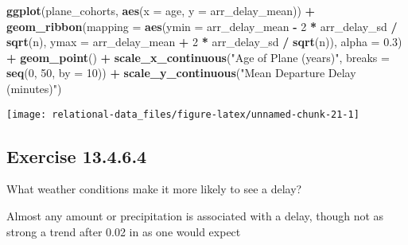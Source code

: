 \documentclass[]{book}
\newenvironment{Shaded}{\begin{snugshade}}{\end{snugshade}}
\newcommand{\DataTypeTok}[1]{\textcolor[rgb]{0.13,0.29,0.53}{#1}}
\newcommand{\DecValTok}[1]{\textcolor[rgb]{0.00,0.00,0.81}{#1}}
\newcommand{\FloatTok}[1]{\textcolor[rgb]{0.00,0.00,0.81}{#1}}
\newcommand{\KeywordTok}[1]{\textcolor[rgb]{0.13,0.29,0.53}{\textbf{#1}}}
\newcommand{\NormalTok}[1]{#1}
\newcommand{\OperatorTok}[1]{\textcolor[rgb]{0.81,0.36,0.00}{\textbf{#1}}}
\newcommand{\StringTok}[1]{\textcolor[rgb]{0.31,0.60,0.02}{#1}}
\theoremstyle{plain}
\theoremstyle{remark}
\begin{document}
\begin{Shaded}
\begin{Highlighting}[]
\KeywordTok{ggplot}\NormalTok{(plane_cohorts, }\KeywordTok{aes}\NormalTok{(}\DataTypeTok{x =}\NormalTok{ age, }\DataTypeTok{y =}\NormalTok{ arr_delay_mean)) }\OperatorTok{+}
\StringTok{  }\KeywordTok{geom_ribbon}\NormalTok{(}\DataTypeTok{mapping =} \KeywordTok{aes}\NormalTok{(}\DataTypeTok{ymin =}\NormalTok{ arr_delay_mean }\OperatorTok{-}\StringTok{ }
\StringTok{                              }\DecValTok{2} \OperatorTok{*}\StringTok{ }\NormalTok{arr_delay_sd }\OperatorTok{/}\StringTok{ }\KeywordTok{sqrt}\NormalTok{(n), }
                            \DataTypeTok{ymax =}\NormalTok{ arr_delay_mean }\OperatorTok{+}\StringTok{ }
\StringTok{                              }\DecValTok{2} \OperatorTok{*}\StringTok{ }\NormalTok{arr_delay_sd }\OperatorTok{/}\StringTok{ }\KeywordTok{sqrt}\NormalTok{(n)),}
              \DataTypeTok{alpha =} \FloatTok{0.3}\NormalTok{) }\OperatorTok{+}
\StringTok{  }\KeywordTok{geom_point}\NormalTok{() }\OperatorTok{+}
\StringTok{  }\KeywordTok{scale_x_continuous}\NormalTok{(}\StringTok{"Age of Plane (years)"}\NormalTok{, }\DataTypeTok{breaks =} \KeywordTok{seq}\NormalTok{(}\DecValTok{0}\NormalTok{, }\DecValTok{50}\NormalTok{, }\DataTypeTok{by =} \DecValTok{10}\NormalTok{)) }\OperatorTok{+}
\StringTok{  }\KeywordTok{scale_y_continuous}\NormalTok{(}\StringTok{"Mean Departure Delay (minutes)"}\NormalTok{)}
\end{Highlighting}
\end{Shaded}

\begin{center}\texttt{[image: relational-data\_files/figure-latex/unnamed-chunk-21-1]} \end{center}

\hypertarget{exercise-13.4.6.4}{%
\subsection*{\texorpdfstring{Exercise
{13.4.6.4}}{Exercise 13.4.6.4}}\label{exercise-13.4.6.4}}

What weather conditions make it more likely to see a delay?

Almost any amount or precipitation is associated with a delay, though
not as strong a trend after 0.02 in as one would expect
\end{document}

